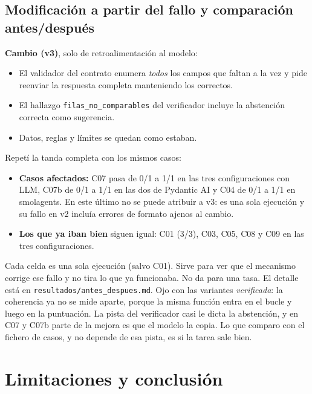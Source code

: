 \documentclass[10pt,a4paper]{article}
\newcommand{\cod}[1]{\texttt{\small #1}}
\begin{document}
\subsection{Modificación a partir del fallo y comparación antes/después}\label{sec:mejora}
\textbf{Cambio (v3)}, solo de retroalimentación al modelo:
\begin{itemize}
\item El validador del contrato enumera \emph{todos} los campos que faltan a la vez y pide reenviar la respuesta completa manteniendo los correctos.
\item El hallazgo \cod{filas\_no\_comparables} del verificador incluye la abstención correcta como sugerencia.
\item Datos, reglas y límites se quedan como estaban.
\end{itemize}
Repetí la tanda completa con los mismos casos:
\begin{itemize}
\item \textbf{Casos afectados:} C07 pasa de 0/1 a 1/1 en las tres configuraciones con LLM, C07b de 0/1 a 1/1 en las dos de Pydantic AI y C04 de 0/1 a 1/1 en smolagents. En este último no se puede atribuir a v3: es una sola ejecución y su fallo en v2 incluía errores de formato ajenos al cambio.
\item \textbf{Los que ya iban bien} siguen igual: C01 (3/3), C03, C05, C08 y C09 en las tres configuraciones.
\end{itemize}
Cada celda es una sola ejecución (salvo C01). Sirve para ver que el mecanismo corrige ese fallo y no tira lo que ya funcionaba. No da para una tasa. El detalle está en \cod{resultados/antes\_despues.md}. Ojo con las variantes \emph{verificada}: la coherencia ya no se mide aparte, porque la misma función entra en el bucle y luego en la puntuación. La pista del verificador casi le dicta la abstención, y en C07 y C07b parte de la mejora es que el modelo la copia. Lo que comparo con el fichero de casos, y no depende de esa pista, es si la tarea sale bien.

\section{Limitaciones y conclusión}\label{sec:lim}
\end{document}
